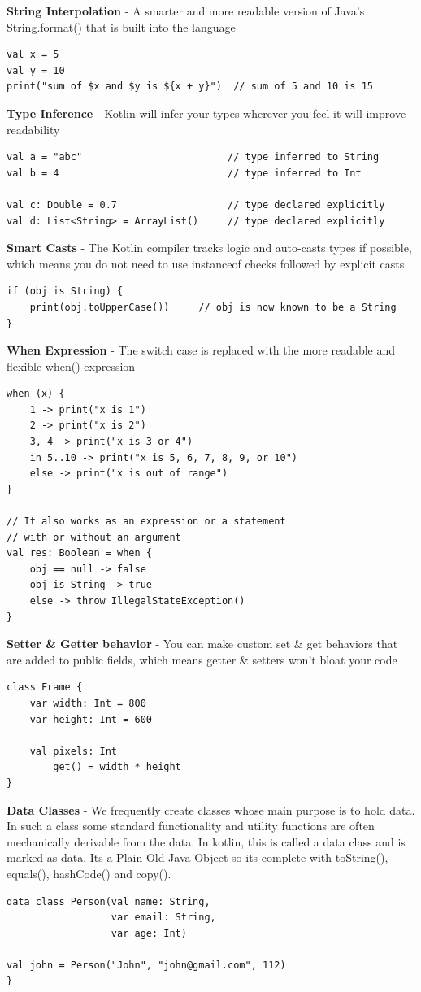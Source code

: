 \textbf{String Interpolation} - A smarter and more readable version of Java's String.format() that is built into the language
\begin{lstlisting}
val x = 5
val y = 10
print("sum of $x and $y is ${x + y}")  // sum of 5 and 10 is 15
\end{lstlisting}

\textbf{Type Inference} - Kotlin will infer your types wherever you feel it will improve readability
\begin{lstlisting}
val a = "abc"                         // type inferred to String
val b = 4                             // type inferred to Int

val c: Double = 0.7                   // type declared explicitly
val d: List<String> = ArrayList()     // type declared explicitly
\end{lstlisting}

\textbf{Smart Casts} - The Kotlin compiler tracks logic and auto-casts types if possible, which means you do not need to use instanceof checks followed by explicit casts
\begin{lstlisting}
if (obj is String) {
    print(obj.toUpperCase())     // obj is now known to be a String
}
\end{lstlisting}

\textbf{When Expression} - The switch case is replaced with the more readable and flexible when() expression
\begin{lstlisting}
when (x) {
    1 -> print("x is 1")
    2 -> print("x is 2")
    3, 4 -> print("x is 3 or 4")
    in 5..10 -> print("x is 5, 6, 7, 8, 9, or 10")
    else -> print("x is out of range")
}

// It also works as an expression or a statement
// with or without an argument
val res: Boolean = when {
    obj == null -> false
    obj is String -> true
    else -> throw IllegalStateException()
}
\end{lstlisting}

\textbf{Setter \& Getter behavior} - You can make custom set \& get behaviors that are added to public fields, which means getter \& setters won't bloat your code
\begin{lstlisting}
class Frame {
    var width: Int = 800
    var height: Int = 600

    val pixels: Int
        get() = width * height
}
\end{lstlisting}

\textbf{Data Classes} - We frequently create classes whose main purpose is to hold data. In such a class some standard functionality and utility functions are often mechanically derivable from the data. In kotlin, this is called a data class and is marked as data. Its a Plain Old Java Object so its complete with toString(), equals(), hashCode() and copy().
\begin{lstlisting}
data class Person(val name: String,
                  var email: String,
                  var age: Int)

val john = Person("John", "john@gmail.com", 112)
}
\end{lstlisting}
